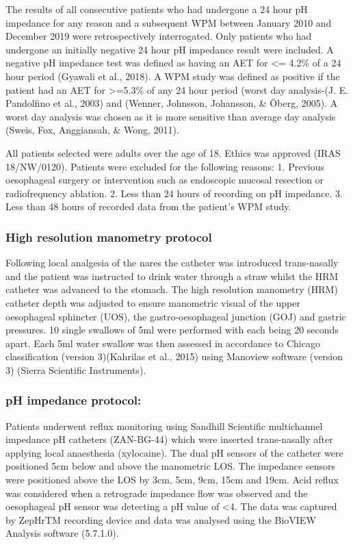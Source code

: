 \documentclass[english,man,floatsintext]{apa6}
\begin{document}
The results of all consecutive patients who had undergone a 24 hour pH impedance for any reason and a subsequent WPM between January 2010 and December 2019 were retrospectively interrogated. Only patients who had undergone an initially negative 24 hour pH impedance result were included. A negative pH impedance test was defined as having an AET for \textless{}= 4.2\% of a 24 hour period (Gyawali et al., 2018). A WPM study was defined as positive if the patient had an AET for \textgreater{}=5.3\% of any 24 hour period (worst day analysis-(J. E. Pandolfino et al., 2003) and (Wenner, Johnsson, Johansson, \& Öberg, 2005). A worst day analysis was chosen as it is more sensitive than average day analysis (Sweis, Fox, Anggiansah, \& Wong, 2011).

All patients selected were adults over the age of 18. Ethics was approved (IRAS 18/NW/0120). Patients were excluded for the following reasons: 1. Previous oesophageal surgery or intervention such as endoscopic mucosal resection or radiofrequency ablation. 2. Less than 24 hours of recording on pH impedance. 3. Less than 48 hours of recorded data from the patient's WPM study.

\hypertarget{high-resolution-manometry-protocol}{%
\subsubsection{High resolution manometry protocol}\label{high-resolution-manometry-protocol}}

Following local analgesia of the nares the catheter was introduced trans-nasally and the patient was instructed to drink water through a straw whilst the HRM catheter was advanced to the stomach. The high resolution manometry (HRM) catheter depth was adjusted to ensure manometric visual of the upper oesophageal sphincter (UOS), the gastro-oesophageal junction (GOJ) and gastric pressures. 10 single swallows of 5ml were performed with each being 20 seconds apart. Each 5ml water swallow was then assessed in accordance to Chicago classification (version 3)(Kahrilas et al., 2015) using Manoview software (version 3) (Sierra Scientific Instruments).

\hypertarget{ph-impedance-protocol}{%
\subsubsection{pH impedance protocol:}\label{ph-impedance-protocol}}

Patients underwent reflux monitoring using Sandhill Scientific multichannel impedance pH catheters (ZAN-BG-44) which were inserted trans-nasally after applying local anaesthesia (xylocaine). The dual pH sensors of the catheter were positioned 5cm below and above the manometric LOS. The impedance sensors were positioned above the LOS by 3cm, 5cm, 9cm, 15cm and 19cm. Acid reflux was considered when a retrograde impedance flow was observed and the oesophageal pH sensor was detecting a pH value of \textless{}4. The data was captured by ZepHrTM recording device and data was analysed using the BioVIEW Analysis software (5.7.1.0).
\end{document}
